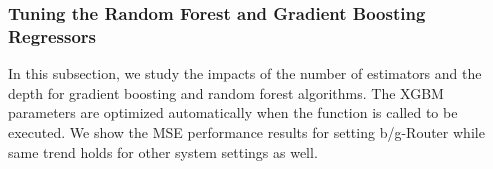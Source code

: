 
\subsubsection{Tuning the Random Forest and Gradient Boosting Regressors}

In this subsection, we study the impacts of the number of estimators and the depth for gradient boosting and random forest algorithms. The XGBM parameters are optimized automatically when the function is called to be executed. We show the MSE performance results for setting b/g-Router while same trend holds for other system settings as well. 

